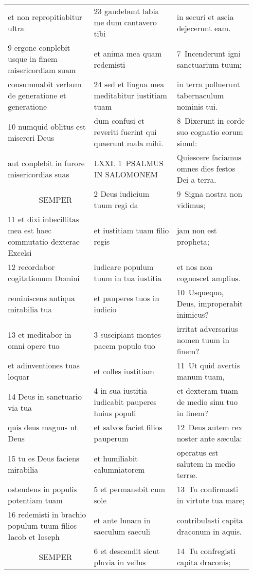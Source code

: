 \documentclass{article}
\begin{document}
\begin{longtable}{@{}p{}p{}p{}@{}}
et non repropitiabitur ultra	&	23 gaudebunt labia me dum cantavero tibi	&	in securi et ascia dejecerunt eam.	\\
9 ergone conplebit usque in finem misericordiam suam	&	et anima mea quam redemisti	&	7 Incenderunt igni sanctuarium tuum;	\\
consummabit verbum de generatione et generatione	&	24 sed et lingua mea meditabitur iustitiam tuam	&	in terra polluerunt tabernaculum nominis tui.	\\
10 numquid oblitus est misereri Deus	&	dum confusi et reveriti fuerint qui quaerunt mala mihi.	&	8 Dixerunt in corde suo cognatio eorum simul:	\\
aut conplebit in furore misericordias suas	&	LXXI. 1 PSALMUS IN SALOMONEM	&	Quiescere faciamus omnes dies festos Dei a terra.	\\
    SEMPER	&	2 Deus iudicium tuum regi da	&	9 Signa nostra non vidimus;	\\
11 et dixi inbecillitas mea est haec commutatio dexterae Excelsi	&	et iustitiam tuam filio regis	&	jam non est propheta;	\\
12 recordabor cogitationum Domini	&	iudicare populum tuum in tua iustitia	&	et nos non cognoscet amplius.	\\
reminiscens antiqua mirabilia tua	&	et pauperes tuos in iudicio	&	10 Usquequo, Deus, improperabit inimicus?	\\
13 et meditabor in omni opere tuo	&	3 suscipiant montes pacem populo tuo	&	irritat adversarius nomen tuum in finem?	\\
et adinventiones tuas loquar	&	et colles iustitiam	&	11 Ut quid avertis manum tuam,	\\
14 Deus in sanctuario via tua	&	4 in sua iustitia iudicabit pauperes huius populi	&	et dexteram tuam de medio sinu tuo in finem?	\\
quis deus magnus ut Deus	&	et salvos faciet filios pauperum	&	12 Deus autem rex noster ante sæcula:	\\
15 tu es Deus faciens mirabilia	&	et humiliabit calumniatorem	&	operatus est salutem in medio terræ.	\\
ostendens in populis potentiam tuam	&	5 et permanebit cum sole	&	13 Tu confirmasti in virtute tua mare;	\\
16 redemisti in brachio populum tuum filios Iacob et Ioseph	&	et ante lunam in saeculum saeculi	&	contribulasti capita draconum in aquis.	\\
    SEMPER	&	6 et descendit sicut pluvia in vellus	&	14 Tu confregisti capita draconis;	\\

\end{longtable}
\end{document}
